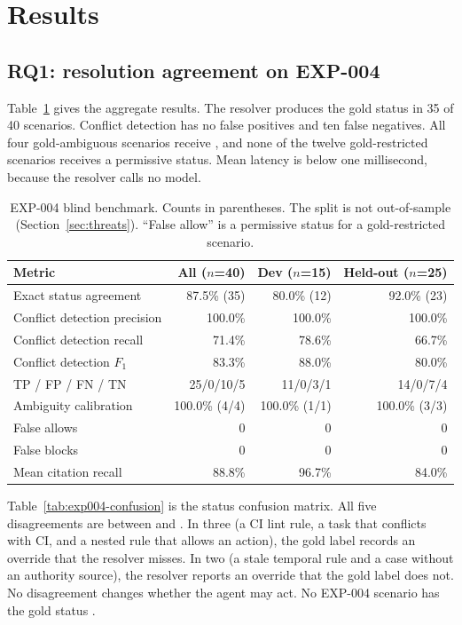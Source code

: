 \section{Results}
\label{sec:results}

\subsection{RQ1: resolution agreement on EXP-004}
Table~\ref{tab:exp004} gives the aggregate results. The resolver produces the gold status in 35 of 40 scenarios. Conflict detection has no false positives and ten false negatives. All four gold-ambiguous scenarios receive \sAMB{}, and none of the twelve gold-restricted scenarios receives a permissive status. Mean latency is below one millisecond, because the resolver calls no model.

\begin{table}[t]
\caption{EXP-004 blind benchmark. Counts in parentheses. The split is not out-of-sample (Section~\ref{sec:threats}). ``False allow'' is a permissive status for a gold-restricted scenario.}
\label{tab:exp004}
\footnotesize
\setlength{\tabcolsep}{3.5pt}
\begin{tabular}{@{}lrrr@{}}
\toprule
Metric & All ($n$=40) & Dev ($n$=15) & Held-out ($n$=25) \\
\midrule
Exact status agreement & 87.5\% (35) & 80.0\% (12) & 92.0\% (23) \\
Conflict detection precision & 100.0\% & 100.0\% & 100.0\% \\
Conflict detection recall & 71.4\% & 78.6\% & 66.7\% \\
Conflict detection $F_1$ & 83.3\% & 88.0\% & 80.0\% \\
\quad TP / FP / FN / TN & 25/0/10/5 & 11/0/3/1 & 14/0/7/4 \\
Ambiguity calibration & 100.0\% (4/4) & 100.0\% (1/1) & 100.0\% (3/3) \\
False allows & 0 & 0 & 0 \\
False blocks & 0 & 0 & 0 \\
Mean citation recall & 88.8\% & 96.7\% & 84.0\% \\
\bottomrule
\end{tabular}
\end{table}

Table~\ref{tab:exp004-confusion} is the status confusion matrix. All five disagreements are between \sP{} and \sPWO{}. In three (a CI lint rule, a task that conflicts with CI, and a nested rule that allows an action), the gold label records an override that the resolver misses. In two (a stale temporal rule and a case without an authority source), the resolver reports an override that the gold label does not. No disagreement changes whether the agent may act. No EXP-004 scenario has the gold status \sBC{}.

